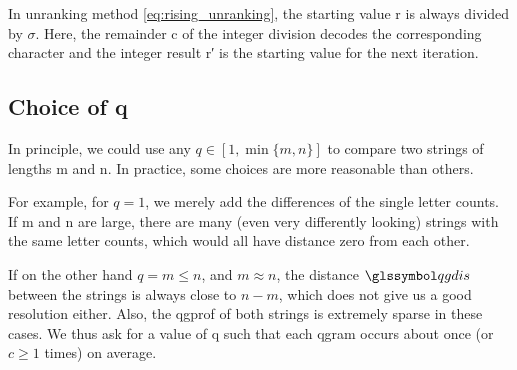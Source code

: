 
In unranking method \eqref{eq:rising_unranking}, the starting value r is always divided by $\sigma$.
Here, the remainder c of the integer division decodes the corresponding character and the integer result r′ is the starting value for the next iteration.


\subsection{Choice of q}\label{subsec:choice-of-q}

In principle, we could use any $q \in [1, \min\{m, n\}]$
 to
compare two strings of lengths m and n.
In practice, some choices are more reasonable than others.

For example, for $q = 1$, we merely add the differences of the single letter counts.
If m and
n are large, there are many (even very differently looking) strings with the same letter
counts, which would all have distance zero from each other.

If on the other hand $q = m \leq n$, and $m \approx n$, the distance $\dqu$  between the strings is always
close to $n - m$, which does not give us a good resolution either.
Also, the \gls{qgprof} of both strings is extremely sparse in these cases.
We thus ask for a value of q such that each \gls{qgram} occurs about once (or $c \geq 1$ times) on average.

